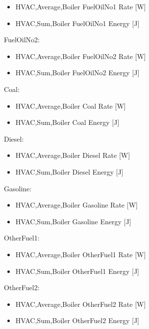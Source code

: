 \begin{itemize}
    \item
    HVAC,Average,Boiler FuelOilNo1 Rate {[}W{]}
    \item
    HVAC,Sum,Boiler FuelOilNo1 Energy {[}J{]}
\end{itemize}

FuelOilNo2:

\begin{itemize}
    \item
    HVAC,Average,Boiler FuelOilNo2 Rate {[}W{]}
    \item
    HVAC,Sum,Boiler FuelOilNo2 Energy {[}J{]}
\end{itemize}

Coal:

\begin{itemize}
    \item
    HVAC,Average,Boiler Coal Rate {[}W{]}
    \item
    HVAC,Sum,Boiler Coal Energy {[}J{]}
\end{itemize}

Diesel:

\begin{itemize}
    \item
    HVAC,Average,Boiler Diesel Rate {[}W{]}
    \item
    HVAC,Sum,Boiler Diesel Energy {[}J{]}
\end{itemize}

Gasoline:

\begin{itemize}
    \item
    HVAC,Average,Boiler Gasoline Rate {[}W{]}
    \item
    HVAC,Sum,Boiler Gasoline Energy {[}J{]}
\end{itemize}

OtherFuel1:

\begin{itemize}
    \item
    HVAC,Average,Boiler OtherFuel1 Rate {[}W{]}
    \item
    HVAC,Sum,Boiler OtherFuel1 Energy {[}J{]}
\end{itemize}

OtherFuel2:

\begin{itemize}
    \item
    HVAC,Average,Boiler OtherFuel2 Rate {[}W{]}
    \item
    HVAC,Sum,Boiler OtherFuel2 Energy {[}J{]}
\end{itemize}

